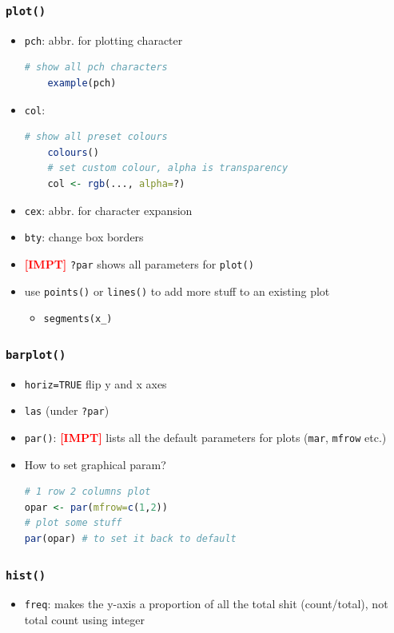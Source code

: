 \documentclass{article}
\newcommand{\impt}[0]{\textcolor{red}{\textbf{[IMPT] }}}
\begin{document}
\begin{multicols}{2}
\subsubsection*{\texttt{plot()}}
\begin{itemize}
	\item \texttt{pch}: abbr. for plotting character
	\begin{lstlisting}[language=R]
	# show all pch characters
	example(pch)\end{lstlisting}
	\item \texttt{col}:
	\begin{lstlisting}[language=R]
	# show all preset colours
	colours()
	# set custom colour, alpha is transparency
	col <- rgb(..., alpha=?)\end{lstlisting}
	\item \texttt{cex}: abbr. for character expansion
	\item \texttt{bty}: change box borders
	\item \impt \texttt{?par} shows all parameters for \texttt{plot()}
	\item use \texttt{points()} or \texttt{lines()} to add more stuff to an existing plot
	\begin{itemize}
		\item \texttt{segments(x\_)}
	\end{itemize}

\end{itemize}
\subsubsection*{\texttt{barplot()}}
\begin{itemize}
	\item \texttt{horiz=TRUE} flip y and x axes
	\item \texttt{las} (under \texttt{?par})
	\item \texttt{par()}: \impt lists all the default parameters for plots (\texttt{mar}, \texttt{mfrow} etc.)
	\item How to set graphical param?
	\begin{lstlisting}[language=R]
# 1 row 2 columns plot
opar <- par(mfrow=c(1,2))
# plot some stuff
par(opar) # to set it back to default
	\end{lstlisting}
\end{itemize}
\subsubsection*{\texttt{hist()}}
\begin{itemize}
	\item \texttt{freq}: makes the y-axis a proportion of all the total shit (count/total), not total count using integer
\end{itemize}

\end{multicols}
\end{document}
